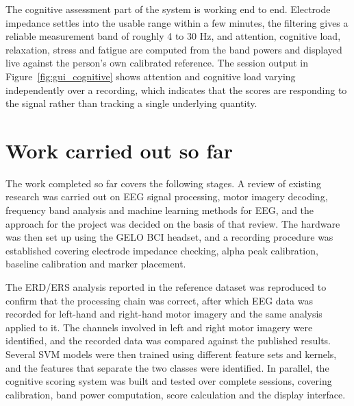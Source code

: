 The cognitive assessment part of the system is working end to end. Electrode impedance
settles into the usable range within a few minutes, the filtering gives a reliable
measurement band of roughly 4 to 30 Hz, and attention, cognitive load, relaxation, stress
and fatigue are computed from the band powers and displayed live against the person's own
calibrated reference. The session output in Figure~\ref{fig:gui_cognitive} shows attention
and cognitive load varying independently over a recording, which indicates that the scores
are responding to the signal rather than tracking a single underlying quantity.

\section{Work carried out so far}

The work completed so far covers the following stages. A review of existing research was
carried out on EEG signal processing, motor imagery decoding, frequency band analysis and
machine learning methods for EEG, and the approach for the project was decided on the basis
of that review. The hardware was then set up using the GELO BCI headset, and a recording
procedure was established covering electrode impedance checking, alpha peak calibration,
baseline calibration and marker placement.

The ERD/ERS analysis reported in the reference dataset was reproduced to confirm that the
processing chain was correct, after which EEG data was recorded for left-hand and
right-hand motor imagery and the same analysis applied to it. The channels involved in left
and right motor imagery were identified, and the recorded data was compared against the
published results. Several SVM models were then trained using different feature sets and
kernels, and the features that separate the two classes were identified. In parallel, the
cognitive scoring system was built and tested over complete sessions, covering calibration,
band power computation, score calculation and the display interface.